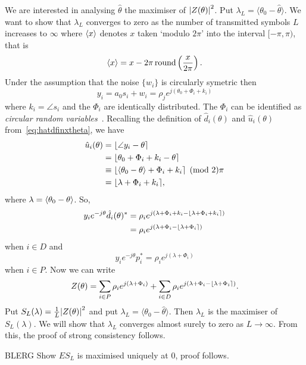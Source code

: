 \documentclass[a4paper,10pt]{article}
\begin{document}
We are interested in analysing $\hat{\theta}$ the maximiser of ${\left| Z(\theta) \right|}^2$.  Put $\lambda_L = \langle\theta_0 - \hat{\theta}\rangle$.  We want to show that $\lambda_L$ converges to zero as the number of transmitted symbols $L$ increases to $\infty$ where $\langle x \rangle$ denotes $x$ taken `modulo $2\pi$' into the interval $[-\pi, \pi)$, that is
\[
\left\langle x \right\rangle = x - 2\pi\operatorname{round}\left(\frac{x}{2\pi}\right).
\]
Under the assumption that the noise $\{w_i\}$ is circularly symetric then
\[
y_i = a_0 s_i + w_i = \rho_j e^{j ( \theta_0 + \Phi_i + k_i) }
\] 
where $k_i = \angle s_i$ and the $\Phi_i$ are identically distributed.  The $\Phi_i$ can be identified as \emph{circular random variables}~\cite{Mardia_directional_statistics,Fisher1993,McKilliam_mean_dir_est_sq_arc_length2010}.  Recalling the definition of $\hat{d}_i(\theta)$ and $\hat{u}_i(\theta)$ from~\eqref{eq:hatdfinxtheta}, we have
\begin{align*}
\hat{u}_i(\theta) &= {\left\lfloor \angle{y_i} - \theta \right\rceil} \\
&= {\left\lfloor \theta_0 + \Phi_i + k_i - \theta \right\rceil} \\
&\equiv {\left\lfloor  \left\langle \theta_0 - \theta \right\rangle + \Phi_i + k_i \right\rceil} \pmod 2\pi \\
&= {\left\lfloor  \lambda + \Phi_i + k_i  \right\rceil},
\end{align*}
where $\lambda = \left\langle \theta_0 - \theta \right\rangle$.  So,
\begin{align*}
 y_i e^{-j\theta} \hat{d}_i(\theta)^* &= \rho_i e^{j(\lambda + \Phi_i + k_i - {\left\lfloor \lambda + \Phi_i + k_i \right\rceil})} \\
&= \rho_i e^{j(\lambda + \Phi_i - {\left\lfloor \lambda + \Phi_i \right\rceil})}
\end{align*}
when $i \in D$ and
\[
y_i e^{-j\theta} p_i^* = \rho_i e^{j(\lambda + \Phi_i)}
\]
when $i \in P$.  Now we can write
\[
Z(\theta) = \sum_{i \in P} \rho_i e^{j(\lambda + \Phi_i)} + \sum_{i \in D}  \rho_i e^{j( \lambda + \Phi_i - {\left\lfloor \lambda + \Phi_i \right\rceil})}.
\]
Put $S_L(\lambda) = \frac{1}{L}{\left| Z(\theta) \right|}^2$ and put $\lambda_L = \langle\theta_0 - \hat{\theta}\rangle$.  Then $\lambda_L$ is the maximiser of $S_L(\lambda)$.  We will show that $\lambda_L$ converges almost surely to zero as $L \rightarrow \infty$.  From this, the proof of strong consistency follows.

BLERG  Show $E S_L$ is maximised uniquely at 0, proof follows.
\end{document}
